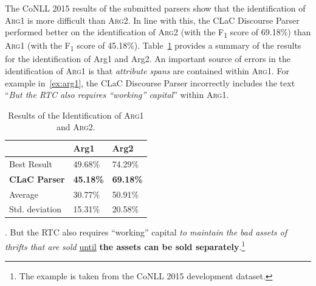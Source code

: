 \documentclass[11pt]{article}
\begin{document}

The CoNLL 2015 results of the submitted parsers show that the identification of \textsc{Arg1} is more difficult than \textsc{Arg2}. In line with this, the CLaC Discourse Parser performed better on the identification of \textsc{Arg2} (with the F\textsubscript{1} score of 69.18\%) than \textsc{Arg1} (with the F\textsubscript{1} score of 45.18\%). Table~\ref{tab:arg} provides a summary of the results for the identification of Arg1 and Arg2. An important source of errors in the identification of \textsc{Arg1} is that \textit{attribute spans} are contained within \textsc{Arg1}. For example in~\ref{ex:arg1}, the CLaC Discourse Parser incorrectly includes the text ``\textit{But the RTC also requires ``working'' capital}'' within \textsc{Arg1}. 

\begin{table}[ht!]
\centering
\begin{tabular}{|l|l|l|}
\hline
    & \textbf{Arg1}    & \textbf{Arg2}    \\ \hline
Best Result    & 49.68\% & 74.29\% \\
\textbf{CLaC Parser}    & \textbf{45.18\%} & \textbf{69.18\%} \\
Average & 30.77\% & 50.91\% \\
Std. deviation     & 15.31\% & 20.58\% \\ \hline
\end{tabular}
\caption{Results of the Identification of \textsc{Arg1} and \textsc{Arg2}.}
\label{tab:arg}
\end{table}

\ex. \label{ex:arg1} But the RTC also requires ``working'' capital \textit{to maintain the bad assets of thrifts that are sold} \underline{until} \textbf{the assets can be sold separately}.\footnote{\label{note1}The example is taken from the CoNLL 2015 development dataset.}
\end{document}
